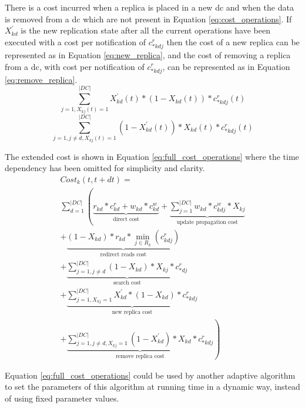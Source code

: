 \documentclass{acm_proc_article-sp}
\begin{document}
There is a cost incurred when a replica is placed in a new \gls{dc} and when the data is removed from a \gls{dc} which are not present in Equation \ref{eq:cost_operations}. If $X^{'}_{kd}$ is the new replication state after all the current operations have been executed with a cost per notification of $c^{r}_{*kdj}$ then the cost of a new replica can be represented as in Equation \ref{eq:new_replica}, and the cost of removing a replica from a \gls{dc}, with cost per notification of $c^{r}_{*kdj}$, can be represented as in Equation \ref{eq:remove_replica}.
\begin{equation} \label{eq:new_replica}
	\sum^{|DC|}_{j = 1, X_{kj}(t) = 1} X^{'}_{kd}(t) * (1 - X_{kd}(t)) * c^{r}_{*kdj}(t)
\end{equation}
\begin{equation} \label{eq:remove_replica}
	\sum^{|DC|}_{j = 1, j \neq d, X_{kj}(t) = 1} (1 - X^{'}_{kd}(t)) * X_{kd}(t) * c^{r}_{*kdj}(t)
\end{equation}

The extended cost is shown in Equation \ref{eq:full_cost_operations} where the time dependency has been omitted for simplicity and clarity.
\begin{equation} \label{eq:full_cost_operations}
	\begin{split}
		Cost_{k}(t, t+dt) =\\
		 \sum^{|DC|}_{d = 1} \left( \underbrace{r_{kd} * c^{r}_{kd} + w_{kd} * c^{w}_{kd}}_\text{direct cost} + \underbrace{\sum^{|DC|}_{j = 1} w_{kd} * c^{w}_{kdj} * X_{kj}}_\text{update propagation cost} \right. \\ 
		\left. + \underbrace{(1 - X_{kd}) * r_{kd} * \min_{j \in R_{k}}(c^{r}_{kdj})}_\text{redirect reads cost} \right. \\ 
		\left. + \underbrace{\sum^{|DC|}_{j = 1, j \neq d}  (1 - X_{kd}) * X_{kj} * c^{r}_{*dj}}_\text{search cost} \right. \\
		\left. + \underbrace{\sum^{|DC|}_{j = 1, X_{kj} = 1} X^{'}_{kd} * (1 - X_{kd}) * c^{r}_{*kdj}}_\text{new replica cost} \right. \\ 
		\left. + \underbrace{\sum^{|DC|}_{j = 1, j \neq d, X_{kj} = 1} (1 - X^{'}_{kd}) * X_{kd} * c^{r}_{*kdj}}_\text{remove replica cost} \right)
	\end{split}
\end{equation}

Equation \ref{eq:full_cost_operations} could be used by another adaptive algorithm to set the parameters of this algorithm at running time in a dynamic way, instead of using fixed parameter values.
\end{document}
